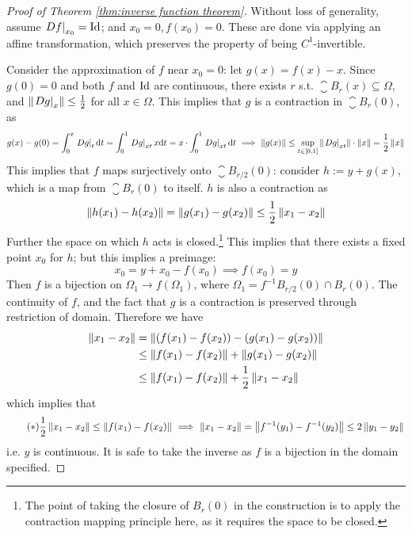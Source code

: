 \documentclass{article}
\begin{document}
\begin{proof}[Proof of Theorem \ref{thm:inverse function theorem}]
    Without loss of generality, assume $\left.Df\right|_{x_0} = \mathrm{Id}$; and $x_0 = 0, f(x_0) = 0$. These are done via applying an affine transformation, which preserves the property of being $C^1$-invertible. 

    Consider the approximation of $f$ near $x_0 = 0$: let $g(x) = f(x) - x$. Since $g(0) = 0$ and both $f$ and $\mathrm{Id}$ are continuous, there exists $r$ s.t. $\closure{B_r(x)} \subseteq \Omega$, and $\left\|\left.Dg\right|_{x}\right\| \leq \frac{1}{2}$ for all $x \in \Omega$. This implies that $g$ is a contraction in $\closure{B_r(0)}$, as
    \[
        g(x) - g(0) = \int_{0}^{x} \left.Dg\right|_{t} \mathrm{d}t = \int_{0}^{1} \left.Dg\right|_{xt} x \mathrm{d}t = x\cdot \int_{0}^{1} \left.Dg\right|_{xt} \mathrm{d}t \ \Longrightarrow\  
        \left\|g(x)\right\| \leq \sup_{t \in [0, 1]} \left\|\left.Dg\right|_{xt}\right\| \cdot \left\|x\right\| = \frac{1}{2} \left\|x\right\|
    \]
    This implies that $f$ maps surjectively onto $\closure{B_{r/2}(0)}$: consider $h := y + g(x)$, which is a map from $\closure{B_r(0)}$ to itself. $h$ is also a contraction as
    \[
        \left\|h(x_1) - h(x_2)\right\| = \left\|g(x_1) - g(x_2)\right\| \leq \frac{1}{2} \left\|x_1 - x_2\right\|
    \] 
    Further the space on which $h$ acts is closed.\footnote{The point of taking the closure of $B_r(0)$ in the construction is to apply the contraction mapping principle here, as it requires the space to be closed.} This implies that there exists a fixed point $x_0$ for $h$; but this implies a preimage:
    \[
        x_0 = y + x_0 - f(x_0) \implies f(x_0) = y
    \]
    Then $f$ is a bijection on $\Omega_1 \to f(\Omega_1)$, where $\Omega_1 = f^{-1} B_{r/2}(0) \cap B_r(0)$. The continuity of $f$, and the fact that $g$ is a contraction is preserved through restriction of domain. Therefore we have
    \begin{align*}
        \left\|x_1 - x_2\right\| 
        & = \left\|(f(x_1) - f(x_2)) - (g(x_1) - g(x_2))\right\| \\
        & \leq \left\|f(x_1) - f(x_2)\right\| + \left\|g(x_1) - g(x_2)\right\| \\
        & \leq \left\|f(x_1) - f(x_2)\right\| + \frac{1}{2} \left\|x_1 - x_2\right\|
    \end{align*}
    which implies that 
    \begin{equation}\tag{$\ast$}\label{eq: linear bound on f}
        \frac{1}{2} \left\|x_1 - x_2\right\| \leq \left\|f(x_1) - f(x_2)\right\| \ \Longrightarrow\  \left\|x_1 - x_2\right\| = \left\|f^{-1}(y_1) - f^{-1}(y_2)\right\| \leq 2\left\|y_1 - y_2\right\|
    \end{equation}
    i.e. $y$ is continuous. It is safe to take the inverse as $f$ is a bijection in the domain specified. 


\end{proof}
\end{document}
